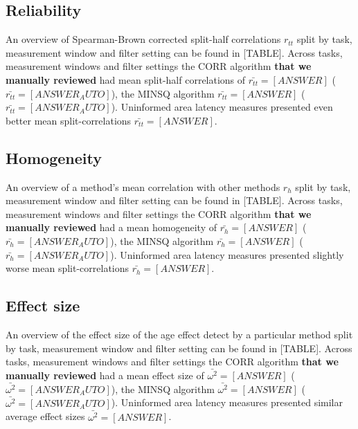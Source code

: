 \documentclass[
  man,floatsintext]{apa7}
\begin{document}
\hypertarget{reliability-1}{%
\subsection{Reliability}\label{reliability-1}}

An overview of Spearman-Brown corrected split-half correlations \(r_{tt}\) split by task, measurement window and filter setting can be found in {[}TABLE{]}. Across tasks, measurement windows and filter settings the CORR algorithm \textbf{that we manually reviewed} had mean split-half correlations of \(\bar{r_{tt}} = [ANSWER]\) (\(\bar{r_{tt}} = [ANSWER_AUTO]\)), the MINSQ algorithm \(\bar{r_{tt}} = [ANSWER]\) (\(\bar{r_{tt}} = [ANSWER_AUTO]\)). Uninformed area latency measures presented even better mean split-correlations \(\bar{r_{tt}} = [ANSWER]\).

\hypertarget{homogeneity-1}{%
\subsection{Homogeneity}\label{homogeneity-1}}

An overview of a method's mean correlation with other methods \(r_h\) split by task, measurement window and filter setting can be found in {[}TABLE{]}. Across tasks, measurement windows and filter settings the CORR algorithm \textbf{that we manually reviewed} had a mean homogeneity of \(\bar{r_{h}} = [ANSWER]\) (\(\bar{r_{h}} = [ANSWER_AUTO]\)), the MINSQ algorithm \(\bar{r_{h}} = [ANSWER]\) (\(\bar{r_{h}} = [ANSWER_AUTO]\)). Uninformed area latency measures presented slightly worse mean split-correlations \(\bar{r_{h}} = [ANSWER]\).

\hypertarget{effect-size-1}{%
\subsection{Effect size}\label{effect-size-1}}

An overview of the effect size of the age effect detect by a particular method split by task, measurement window and filter setting can be found in {[}TABLE{]}. Across tasks, measurement windows and filter settings the CORR algorithm \textbf{that we manually reviewed} had a mean effect size of \(\bar{\omega^2} = [ANSWER]\) (\(\bar{\omega^2} = [ANSWER_AUTO]\)), the MINSQ algorithm \(\bar{\omega^2} = [ANSWER]\) (\(\bar{\omega^2} = [ANSWER_AUTO]\)). Uninformed area latency measures presented similar average effect sizes \(\bar{\omega^2} = [ANSWER]\).
\end{document}
